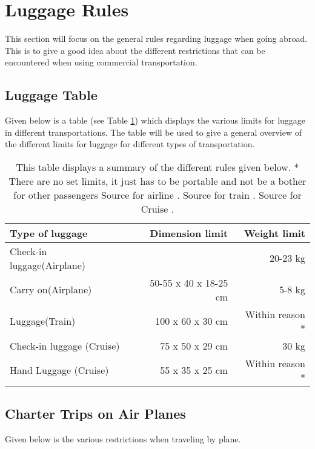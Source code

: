 \section{Luggage Rules}
\label{sec:LugRules}
This section will focus on the general rules regarding luggage when going abroad. This is to give a good idea about the different restrictions that can be encountered when using commercial transportation.
\subsection{Luggage Table}
Given below is a table (see Table \ref{tab:Lug}) which displays the various limits for luggage in different transportations. The table will be used to give a general overview of the different limits for luggage for different types of transportation.
\begin{table}[H]
\begin{center}
\begin{tabular}{| l | r | r |}
\hline
Type of luggage &  Dimension limit & Weight limit \\ \hline
Check-in luggage(Airplane) & & 20-23 kg \\ \hline
Carry on(Airplane) & 50-55 x 40 x 18-25 cm & 5-8 kg \\ \hline
Luggage(Train) & 100 x 60 x 30 cm & Within reason *\\ \hline
Check-in luggage (Cruise) & 75 x 50 x 29 cm & 30 kg \\ \hline
Hand Luggage (Cruise) & 55 x 35 x 25 cm & Within reason *\\ \hline
\end{tabular}
\caption{This table displays a summary of the different rules given below.\newline
* There are no set limits, it just has to be portable and not be a bother for other passengers\newline
Source for airline \citep{SAS}. Source for train \citep{idianrules}. Source for Cruise \citep{Cruise}.}
\label{tab:Lug}
\end{center}
\end{table}

\subsection{Charter Trips on Air Planes}
Given below is the various restrictions when traveling by plane.

